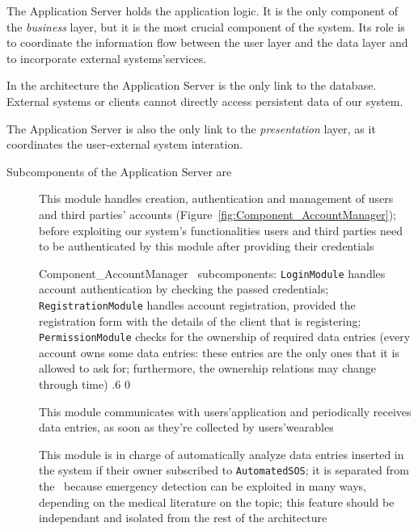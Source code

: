 \documentclass[../DD0.tex]{subfiles}
\begin{document}
        The Application Server holds the application logic. It is the only component of the \textit{business} layer, but it is the most crucial component of the system. Its role is to coordinate the information flow between the user layer and the data layer and to incorporate external systems'services.

        In the architecture the Application Server is the only link to the database. External systems or clients cannot directly access persistent data of our system.

        The Application Server is also the only link to the \textit{presentation} layer, as it  coordinates the user-external system interation.

        Subcomponents of the Application Server are
        \begin{description}
          \item[\AccountManager] This module handles creation, authentication and management of users and third parties' accounts (Figure~\ref{fig:Component_AccountManager}); before exploiting our system's functionalities users and third parties need to be authenticated by this module after providing their credentials

          \fetchUML
            {Component_AccountManager}
            {\AccountManager\ subcomponents: \texttt{LoginModule} handles account authentication by checking the passed credentials; \texttt{RegistrationModule} handles account registration, provided the registration form with the details of the client that is registering; \texttt{PermissionModule} checks for the ownership of required data entries (every account owns some data entries: these entries are the only ones that it is allowed to ask for; furthermore, the ownership relations may change through time)}
            {.6}           %
            {0}           %

          \item[\DataCollector] This module communicates with users'application and periodically receives data entries, as soon as they're collected by users'wearables

          \item[\EmergencyDetector] This module is in charge of automatically analyze data entries inserted in the system if their owner subscribed to \texttt{AutomatedSOS}; it is separated from the \DataCollector\ because emergency detection can be exploited in many ways, depending on the medical literature on the topic; this feature should be independant and isolated from the rest of the architecture


\end{description}
\end{document}

